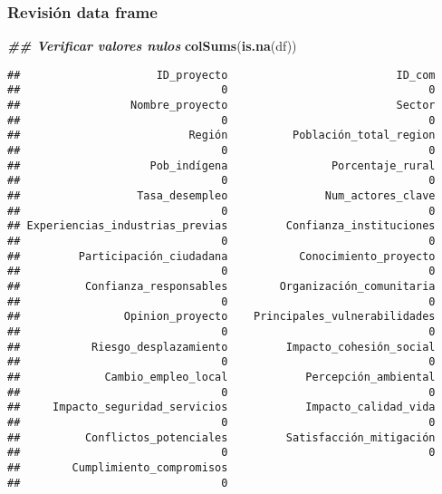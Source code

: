 \documentclass[
]{article}
\newenvironment{Shaded}{\begin{snugshade}}{\end{snugshade}}
\newcommand{\DocumentationTok}[1]{\textcolor[rgb]{0.56,0.35,0.01}{\textbf{\textit{#1}}}}
\newcommand{\FunctionTok}[1]{\textcolor[rgb]{0.13,0.29,0.53}{\textbf{#1}}}
\newcommand{\NormalTok}[1]{#1}
\begin{document}
\subsubsection{Revisión data frame}\label{revisiuxf3n-data-frame}

\begin{Shaded}
\begin{Highlighting}[]
\DocumentationTok{\#\# Verificar valores nulos}
\FunctionTok{colSums}\NormalTok{(}\FunctionTok{is.na}\NormalTok{(df))}
\end{Highlighting}
\end{Shaded}

\begin{verbatim}
##                     ID_proyecto                          ID_com 
##                               0                               0 
##                 Nombre_proyecto                          Sector 
##                               0                               0 
##                          Región          Población_total_region 
##                               0                               0 
##                    Pob_indígena                Porcentaje_rural 
##                               0                               0 
##                  Tasa_desempleo               Num_actores_clave 
##                               0                               0 
## Experiencias_industrias_previas         Confianza_instituciones 
##                               0                               0 
##         Participación_ciudadana           Conocimiento_proyecto 
##                               0                               0 
##          Confianza_responsables        Organización_comunitaria 
##                               0                               0 
##                Opinion_proyecto    Principales_vulnerabilidades 
##                               0                               0 
##           Riesgo_desplazamiento         Impacto_cohesión_social 
##                               0                               0 
##             Cambio_empleo_local            Percepción_ambiental 
##                               0                               0 
##     Impacto_seguridad_servicios            Impacto_calidad_vida 
##                               0                               0 
##          Conflictos_potenciales         Satisfacción_mitigación 
##                               0                               0 
##        Cumplimiento_compromisos 
##                               0
\end{verbatim}
\end{document}
